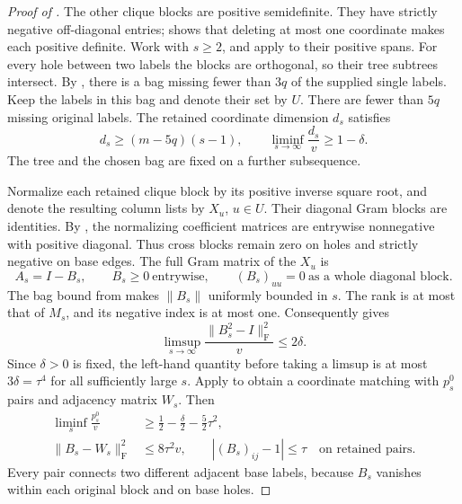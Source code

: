 \begin{proof}[Proof of ]
The other clique blocks are positive semidefinite.  They have strictly
negative off-diagonal entries;  shows that
deleting at most one coordinate makes each positive definite.  Work
with $s\ge2$, and apply  to their positive spans.
For every hole between two labels the blocks are orthogonal, so their
tree subtrees intersect.  By , there is a bag
missing fewer than $3q$ of the supplied single labels.  Keep the labels
in this bag and denote their set by $U$.  There are fewer than $5q$
missing original labels.  The retained coordinate dimension $d_s$
satisfies
\begin{equation}\label{mr:first-dimension}
 d_s\ge(m-5q)(s-1),
 \qquad \liminf_{s\to\infty}\frac{d_s}{v}\ge1-\delta.
\end{equation}
The tree and the chosen bag are fixed on a further subsequence.

Normalize each retained clique block by its positive inverse square
root, and denote the resulting column lists by $X_u$, $u\in U$.
Their diagonal Gram blocks are identities.  By
, the normalizing coefficient matrices are
entrywise nonnegative with positive diagonal.  Thus cross blocks remain
zero on holes and strictly negative on base edges.  The full Gram matrix
of the $X_u$ is
\begin{equation}\label{mr:first-gram}
 A_s=I-B_s,
 \qquad B_s\ge0\ \text{entrywise},
 \qquad (B_s)_{uu}=0\ \text{as a whole diagonal block}.
\end{equation}
The bag bound from  makes
$\|B_s\|$ uniformly bounded in $s$.  The rank is at most that of
$M_s$, and its negative index is at most one.  Consequently
 gives
\[
 \limsup_{s\to\infty}\frac{\|B_s^2-I\|_{\mathrm F}^2}{v}
 \le2\delta.
\]
Since $\delta>0$ is fixed, the left-hand quantity before taking a
limsup is at most $3\delta=\tau^4$ for all sufficiently large $s$.
Apply  to obtain a coordinate matching with $p_s^0$
pairs and adjacency matrix $W_s$.  Then
\begin{equation}\label{mr:first-matching}
 \begin{split}
 \liminf_s\frac{p_s^0}{v}
     &\ge\frac12-\frac\delta2-\frac52\tau^2,\\
 \|B_s-W_s\|_{\mathrm F}^2&\le8\tau^2v,
 \qquad |(B_s)_{ij}-1|\le\tau
          \quad\text{on retained pairs}.
 \end{split}
\end{equation}
Every pair connects two different adjacent base labels, because
$B_s$ vanishes within each original block and on base holes.


\end{proof}
